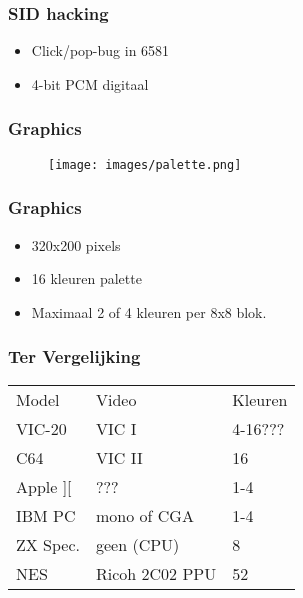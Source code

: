 \documentclass[aspectratio=43]{uva-inf-presentation}
\begin{document}

\begin{frame}
\frametitle{SID hacking}

\begin{itemize}
\item Click/pop-bug in 6581
\item 4-bit PCM digitaal
\end{itemize}

\end{frame}


\begin{frame}
\frametitle{Graphics}

\begin{figure}
\texttt{[image: images/palette.png]}
\end{figure}

\end{frame}


\begin{frame}
\frametitle{Graphics}

\begin{itemize}
\item 320x200 pixels
\item 16 kleuren palette
\item Maximaal 2 of 4 kleuren per 8x8 blok.
\end{itemize}

\end{frame}


\begin{frame}
\frametitle{Ter Vergelijking}

\begin{tabular}{|l|l|l|}
\hline Model & Video & Kleuren \\
VIC-20 & VIC I & 4-16??? \\
C64 & VIC II & 16 \\
Apple ][ & ??? & 1-4 \\
IBM PC & mono of CGA & 1-4 \\
ZX Spec. & geen (CPU) & 8 \\ \hline
NES & Ricoh 2C02 PPU & 52 \\ \hline
\end{tabular}

\end{frame}
\end{document}
